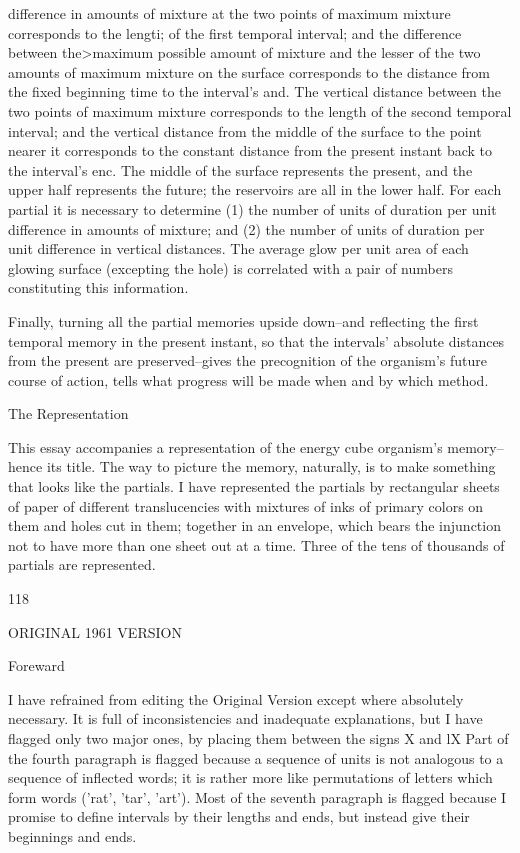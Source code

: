\documentclass[10pt,twoside]{memoir}
\begin{document}
\begin{enumerate}
{{{{{{{{{{{{{{{difference in amounts of mixture at the two points of maximum mixture 
corresponds to the lengti; of the first temporal interval; and the difference 
between the>maximum possible amount of mixture and the lesser of the two 
amounts of maximum mixture on the surface corresponds to the distance 
from the fixed beginning time to the interval's and. The vertical distance 
between the two points of maximum mixture corresponds to the length of 
the second temporal interval; and the vertical distance from the middle of 
the surface to the point nearer it corresponds to the constant distance from 
the present instant back to the interval's enc. The middle of the surface 
represents the present, and the upper half represents the future; the 
reservoirs are all in the lower half. For each partial it is necessary to 
determine (1) the number of units of duration per unit difference in 
amounts of mixture; and (2) the number of units of duration per unit 
difference in vertical distances. The average glow per unit area of each 
glowing surface (excepting the hole) is correlated with a pair of numbers 
constituting this information. 

Finally, turning all the partial memories upside down--and reflecting the 
first temporal memory in the present instant, so that the intervals' absolute 
distances from the present are preserved--gives the precognition of the 
organism's future course of action, tells what progress will be made when 
and by which method. 


The Representation 

This essay accompanies a representation of the energy cube organism's 
memory--hence its title. The way to picture the memory, naturally, is to 
make something that looks like the partials. I have represented the partials 
by rectangular sheets of paper of different translucencies with mixtures of 
inks of primary colors on them and holes cut in them; together in an 
envelope, which bears the injunction not to have more than one sheet out at 
a time. Three of the tens of thousands of partials are represented. 


118 


ORIGINAL 1961 VERSION 


Foreward 

I have refrained from editing the Original Version except where 
absolutely necessary. It is full of inconsistencies and inadequate 
explanations, but I have flagged only two major ones, by placing them 
between the signs X and lX Part of the fourth paragraph is flagged because a 
sequence of units is not analogous to a sequence of inflected words; it is 
rather more like permutations of letters which form words ('rat', 'tar', 'art'). 
Most of the seventh paragraph is flagged because I promise to define intervals 
by their lengths and ends, but instead give their beginnings and ends. 

}}}}}}}}}}}}}}}
\end{enumerate}
\end{document}
